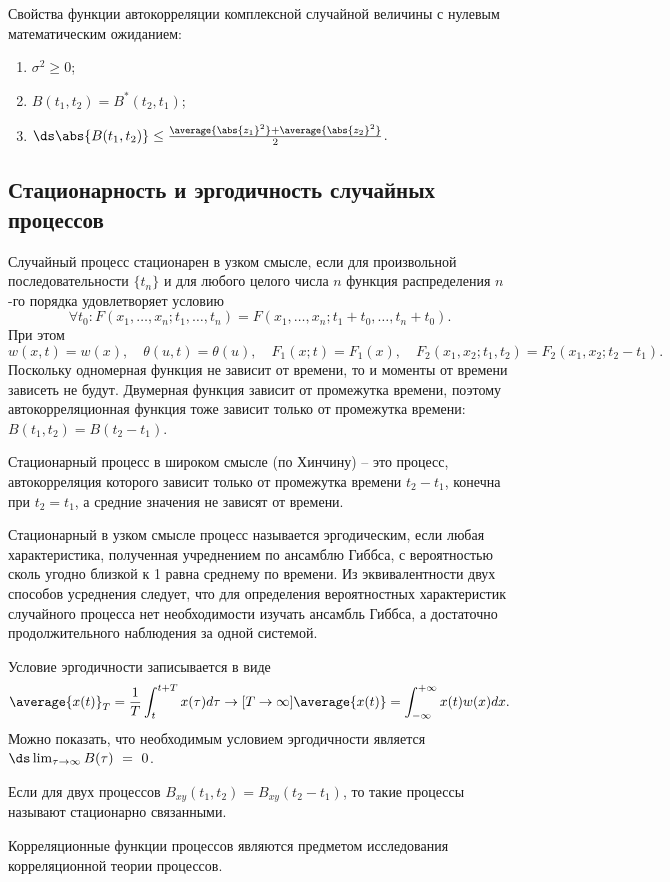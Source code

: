 Свойства функции автокорреляции комплексной случайной величины с нулевым
математическим ожиданием:
\begin{enumerate}
    \item \( \sigma^2 \ge 0 \);
    \item \( B(t_1,t_2) = B^*(t_2,t_1) \);
    \item \( \ds \abs{B(t_1,t_2)} \le \frac{\average{\abs{z_1}^2} +
        \average{\abs{z_2}^2}}{2} \).
\end{enumerate}

\subsection{Стационарность и эргодичность случайных процессов}
Случайный процесс стационарен в узком смысле, если для произвольной
последовательности \( \{t_n\} \) и для любого целого числа \( n \)  функция
распределения \( n \)-го порядка удовлетворяет условию
\[
    \forall t_0:
    F(x_1,\ldots,x_n;t_1,\ldots,t_n) = F(x_1,\ldots,x_n;t_1+t_0,\ldots,t_n+t_0).
\]
При этом
\[
    w(x,t) = w(x),\quad \theta(u,t) = \theta(u),\quad F_1(x;t) = F_1(x),\quad
    F_2(x_1,x_2;t_1,t_2) = F_2(x_1,x_2;t_2-t_1).
\]
Поскольку одномерная функция не зависит от времени, то и моменты от времени
зависеть не будут. Двумерная функция зависит от промежутка времени, поэтому
автокорреляционная функция тоже зависит только от промежутка времени:
\( B(t_1,t_2) = B(t_2-t_1) \).

Стационарный процесс в широком смысле (по Хинчину) -- это процесс,
автокорреляция которого зависит только от промежутка времени \( t_2 - t_1 \),
конечна при \( t_2 = t_1 \), а средние значения не зависят от времени.

Стационарный в узком смысле процесс называется эргодическим, если любая
характеристика, полученная учреднением по ансамблю Гиббса, с вероятностью сколь
угодно близкой к 1 равна среднему по времени. Из эквивалентности двух способов
усреднения следует, что для определения вероятностных характеристик случайного
процесса нет необходимости изучать ансамбль Гиббса, а достаточно
продолжительного наблюдения за одной системой.

Условие эргодичности записывается в виде
\[
    \average{x(t)}_T = \frac{1}{T}\int_t^{t+T} x(\tau)d\tau \to[T\to\infty]
    \average{x(t)} = \int_{-\infty}^{+\infty} x(t)w(x)dx.
\]
Можно показать, что необходимым условием эргодичности является
\(\ds \lim_{\tau\to\infty}B(\tau)~=~0 \).

Если для двух процессов \( B_{xy}(t_1,t_2) = B_{xy}(t_2-t_1) \), то такие
процессы называют стационарно связанными.

Корреляционные функции процессов являются предметом исследования корреляционной
теории процессов.
